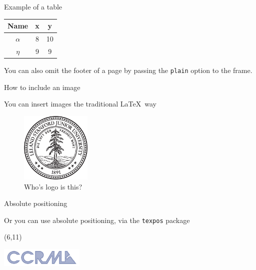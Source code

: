 \documentclass{beamer}
\begin{document}
\begin{frame}[plain]{Example of a table}

    \vspace{2cm}

    \begin{center}
        \begin{tabular}{c c c}
        \bf Name & \bf x & \bf y \\
        \hline
        $\alpha$ & 8 & 10 \\
        $\eta$ & 9 & 9 \\
        \hline
        \end{tabular}
    \end{center}

    \vspace{2cm}

    \begin{center}
    \scriptsize
    \hfill You can also omit the footer of a page by passing the \texttt{plain}
    option to the frame.
    \end{center}

\end{frame}

\begin{frame}{How to include an image}

    You can insert images the traditional \LaTeX~way

    \begin{figure}
        \includegraphics[width=0.3\textwidth]{stanford-logo.pdf}
        \caption{Who's logo is this?}
    \end{figure}
\end{frame}


\begin{frame}{Absolute positioning}

    Or you can use absolute positioning, via the \texttt{texpos} package



    \begin{textblock}{20}(6,11)
    \begin{rotate}{33}
      \includegraphics[width=0.3\textwidth]{ccrma-logo.pdf}
    \end{rotate}
    \end{textblock}


\end{frame}
\end{document}
